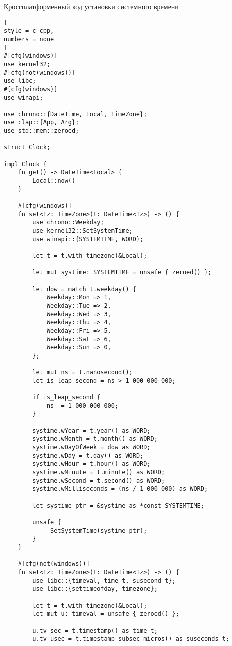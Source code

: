 \documentclass[%
	11pt,
	a4paper,
	utf8,
		]{article}
\begin{document}
Кроссплатформенный код установки системного времени
\begin{lstlisting}[
style = c_cpp,
numbers = none	
]
#[cfg(windows)]
use kernel32;
#[cfg(not(windows))]
use libc;
#[cfg(windows)]
use winapi;

use chrono::{DateTime, Local, TimeZone};
use clap::{App, Arg};
use std::mem::zeroed;

struct Clock;

impl Clock {
    fn get() -> DateTime<Local> {
        Local::now()
    }

    #[cfg(windows)]
    fn set<Tz: TimeZone>(t: DateTime<Tz>) -> () {
        use chrono::Weekday;
        use kernel32::SetSystemTime;
        use winapi::{SYSTEMTIME, WORD};
        
        let t = t.with_timezone(&Local);
        
        let mut systime: SYSTEMTIME = unsafe { zeroed() };
        
        let dow = match t.weekday() {
            Weekday::Mon => 1,
            Weekday::Tue => 2,
            Weekday::Wed => 3,
            Weekday::Thu => 4,
            Weekday::Fri => 5,
            Weekday::Sat => 6,
            Weekday::Sun => 0,
        };
    
        let mut ns = t.nanosecond();
        let is_leap_second = ns > 1_000_000_000;
        
        if is_leap_second {
            ns -= 1_000_000_000;
        }
    
        systime.wYear = t.year() as WORD;
        systime.wMonth = t.month() as WORD;
        systime.wDayOfWeek = dow as WORD;
        systime.wDay = t.day() as WORD;
        systime.wHour = t.hour() as WORD;
        systime.wMinute = t.minute() as WORD;
        systime.wSecond = t.second() as WORD;
        systime.wMilliseconds = (ns / 1_000_000) as WORD;
        
        let systime_ptr = &systime as *const SYSTEMTIME;
        
        unsafe {
             SetSystemTime(systime_ptr);
        }
    }

    #[cfg(not(windows))]
    fn set<Tz: TimeZone>(t: DateTime<Tz>) -> () {
        use libc::{timeval, time_t, susecond_t};
        use libc::{settimeofday, timezone};
        
        let t = t.with_timezone(&Local);
        let mut u: timeval = unsafe { zeroed() };
        
        u.tv_sec = t.timestamp() as time_t;
        u.tv_usec = t.timestamp_subsec_micros() as suseconds_t;
        

\end{lstlisting}
\end{document}
